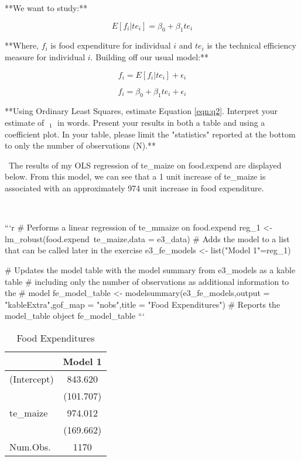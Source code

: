 \documentclass[
]{article}
\begin{document}
\begin{}
**We want to study:**

$$E[f_i|te_i] = \beta_0 + \beta_1 te_i$$

**Where, $f_i$ is food expenditure for individual $i$ and $te_i$ is the technical efficiency measure for individual $i$. Building off our usual model:**

$$ f_i = E[f_i|te_i] + \epsilon_i$$

$$\begin{equation} 
\tag{1} \label{eqn:q2}
    f_i = \beta_0 + \beta_1 te_i + \epsilon_i
\end{equation}$$

**Using Ordinary Least Squares, estimate Equation \ref{eqn:q2}. Interpret your estimate of $\mathop{\mathrm{\hat{\beta}}}_1$ in words. Present your results in both a table and using a coefficient plot. In your table, please limit the "statistics" reported at the bottom to only the number of observations (N).**



\
The results of my OLS regression of te_maize on food.expend are displayed below. From this model, we can see that a 1 unit increase of te_maize is associated with an approximately 974 unit increase in food expenditure.

\

```r
# Performs a linear regression of te_mmaize on food.expend
reg_1 <- lm_robust(food.expend~te_maize,data = e3_data)
# Adds the model to a list that can be called later in the exercise
e3_fe_models <- list("Model 1"=reg_1)

# Updates the model table with the model summary from e3_models as a kable table
# including only the number of observations as additional information to the 
# model
fe_model_table <- modelsummary(e3_fe_models,output = "kableExtra",gof_map = "nobs",title = "Food Expenditures") %
# Reports the model_table object
fe_model_table
```

\begin{table}

\caption{\label{tab:unnamed-chunk-5}Food Expenditures}
\centering
\begin{tabular}[t]{lc}
\toprule
  & Model 1\\
\midrule
(Intercept) & \num{843.620}\\
 & (\num{101.707})\\
te\_maize & \num{974.012}\\
 & (\num{169.662})\\
\midrule
Num.Obs. & \num{1170}\\
\bottomrule
\end{tabular}
\end{table}


\end{}
\end{document}
